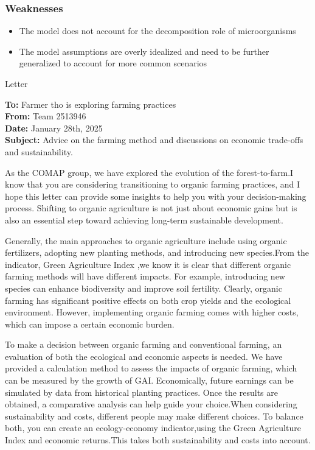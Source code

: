 \documentclass[12pt]{article}  %
\begin{document}
\subsubsection{Weaknesses}
\begin{itemize}
    \item The model does not account for the decomposition role of microorganisms
    \item The model assumptions are overly idealized and need to be further generalized to account for more common scenarios
\end{itemize}
\newpage
\sffamily
\begin{letter}{Letter}
\BgThispage
\begin{flushleft}  %
\textbf{To:} Farmer tho is exploring farming practices\\
\textbf{From:} Team 2513946\\
\textbf{Date:} January 28th, 2025\\
\textbf{Subject:} Advice on the farming method and discussions on economic trade-offs and sustainability.
\end{flushleft}

As the COMAP group, we have explored the evolution of the forest-to-farm.I know that you are considering transitioning to organic farming practices, and I hope this letter can provide some insights to help you with your decision-making process. Shifting to organic agriculture is not just about economic gains but is also an essential step toward achieving long-term sustainable development.

Generally, the main approaches to organic agriculture include using organic fertilizers, adopting new planting methods, and introducing new species.From the indicator, Green Agriculture Index ,we know it is clear that different organic farming methods will have different impacts. For example, introducing new species can enhance biodiversity and improve soil fertility. Clearly, organic farming has significant positive effects on both crop yields and the ecological environment. However, implementing organic farming comes with higher costs, which can impose a certain economic burden.

To make a decision between organic farming and conventional farming, an evaluation of both the ecological and economic aspects is needed. We have provided a calculation method to assess the impacts of organic farming, which can be measured by the growth of GAI. Economically, future earnings can be simulated by data from historical planting practices. Once the results are obtained, a comparative analysis can help guide your choice.When considering sustainability and costs, different people may make different choices. To balance both, you can create an ecology-economy indicator,using the Green Agriculture Index and economic returns.This takes both sustainability and costs into account.


\end{letter}
\end{document}
